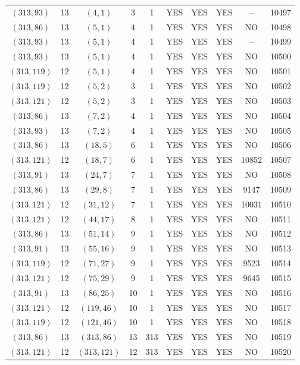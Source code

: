 \begin{longtable}{|c|c|c|c|c|c|c|c|c|c|}
$(313, 93)$ & 13 & $(4, 1)$ & 3 & 1 & YES & YES & YES & -- & 10497\\
$(313, 86)$ & 13 & $(5, 1)$ & 4 & 1 & YES & YES & YES & NO & 10498\\
$(313, 93)$ & 13 & $(5, 1)$ & 4 & 1 & YES & YES & YES & -- & 10499\\
$(313, 93)$ & 13 & $(5, 1)$ & 4 & 1 & YES & YES & YES & NO & 10500\\
$(313, 119)$ & 12 & $(5, 1)$ & 4 & 1 & YES & YES & YES & NO & 10501\\
$(313, 119)$ & 12 & $(5, 2)$ & 3 & 1 & YES & YES & YES & NO & 10502\\
$(313, 121)$ & 12 & $(5, 2)$ & 3 & 1 & YES & YES & YES & NO & 10503\\
$(313, 86)$ & 13 & $(7, 2)$ & 4 & 1 & YES & YES & YES & NO & 10504\\
$(313, 93)$ & 13 & $(7, 2)$ & 4 & 1 & YES & YES & YES & NO & 10505\\
$(313, 86)$ & 13 & $(18, 5)$ & 6 & 1 & YES & YES & YES & NO & 10506\\
$(313, 121)$ & 12 & $(18, 7)$ & 6 & 1 & YES & YES & YES & 10852 & 10507\\
$(313, 91)$ & 13 & $(24, 7)$ & 7 & 1 & YES & YES & YES & NO & 10508\\
$(313, 86)$ & 13 & $(29, 8)$ & 7 & 1 & YES & YES & YES & 9147 & 10509\\
$(313, 121)$ & 12 & $(31, 12)$ & 7 & 1 & YES & YES & YES & 10031 & 10510\\
$(313, 121)$ & 12 & $(44, 17)$ & 8 & 1 & YES & YES & YES & NO & 10511\\
$(313, 86)$ & 13 & $(51, 14)$ & 9 & 1 & YES & YES & YES & NO & 10512\\
$(313, 91)$ & 13 & $(55, 16)$ & 9 & 1 & YES & YES & YES & NO & 10513\\
$(313, 119)$ & 12 & $(71, 27)$ & 9 & 1 & YES & YES & YES & 9523 & 10514\\
$(313, 121)$ & 12 & $(75, 29)$ & 9 & 1 & YES & YES & YES & 9645 & 10515\\
$(313, 91)$ & 13 & $(86, 25)$ & 10 & 1 & YES & YES & YES & NO & 10516\\
$(313, 121)$ & 12 & $(119, 46)$ & 10 & 1 & YES & YES & YES & NO & 10517\\
$(313, 119)$ & 12 & $(121, 46)$ & 10 & 1 & YES & YES & YES & NO & 10518\\
$(313, 86)$ & 13 & $(313, 86)$ & 13 & 313 & YES & YES & YES & NO & 10519\\
$(313, 121)$ & 12 & $(313, 121)$ & 12 & 313 & YES & YES & YES & NO & 10520\\

\end{longtable}
